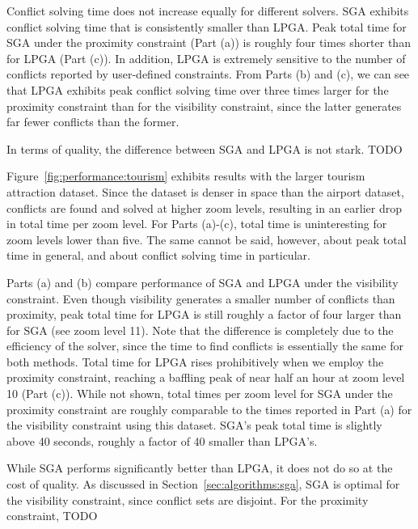 Conflict solving time does not increase equally for different solvers. SGA exhibits conflict solving time that is consistently smaller than LPGA. Peak total time for SGA under the proximity constraint (Part (a)) is roughly four times shorter than for LPGA (Part (c)). In addition, LPGA is extremely sensitive to the number of conflicts reported by user-defined constraints. From Parts (b) and (c), we can see that LPGA exhibits peak conflict solving time over three times larger for the proximity constraint than for the visibility constraint, since the latter generates far fewer conflicts than the former. 


In terms of quality, the difference between SGA and LPGA is not stark. TODO


Figure~\ref{fig:performance:tourism} exhibits results with the larger tourism attraction dataset. Since the dataset is denser in space than the airport dataset, conflicts are found and solved at higher zoom levels, resulting in an earlier drop in total time per zoom level. For Parts (a)-(c), total time is uninteresting for zoom levels lower than five. The same cannot be said, however, about peak total time in general, and about conflict solving time in particular.

Parts (a) and (b) compare performance of SGA and LPGA under the visibility constraint. Even though visibility generates a smaller number of conflicts than proximity, peak total time for LPGA is still roughly a factor of four larger than for SGA (see zoom level 11). Note that the difference is completely due to the efficiency of the solver, since the time to find conflicts is essentially the same for both methods. Total time for LPGA rises prohibitively when we employ the proximity constraint, reaching a baffling peak of near half an hour at zoom level 10 (Part (c)). While not shown, total times per zoom level for SGA under the proximity constraint are roughly comparable to the times reported in Part (a) for the visibility constraint using this dataset. SGA's peak total time is slightly above 40 seconds, roughly a factor of 40 smaller than LPGA's.         

While SGA performs significantly better than LPGA, it does not do so at the cost of quality. As discussed in Section~\ref{sec:algorithms:sga}, SGA is optimal for the visibility constraint, since conflict sets are disjoint. For the proximity constraint, TODO

